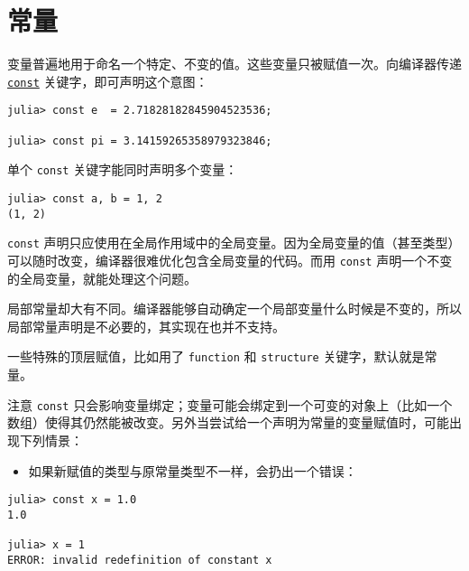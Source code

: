 \hypertarget{5407065244463689569}{}


\section{常量}



变量普遍地用于命名一个特定、不变的值。这些变量只被赋值一次。向编译器传递 \hyperlink{8421885763632484758}{\texttt{const}} 关键字，即可声明这个意图：




\begin{verbatim}
julia> const e  = 2.71828182845904523536;

julia> const pi = 3.14159265358979323846;
\end{verbatim}



单个 \texttt{const} 关键字能同时声明多个变量：




\begin{verbatim}
julia> const a, b = 1, 2
(1, 2)
\end{verbatim}



\texttt{const} 声明只应使用在全局作用域中的全局变量。因为全局变量的值（甚至类型）可以随时改变，编译器很难优化包含全局变量的代码。而用 \texttt{const} 声明一个不变的全局变量，就能处理这个问题。



局部常量却大有不同。编译器能够自动确定一个局部变量什么时候是不变的，所以局部常量声明是不必要的，其实现在也并不支持。



一些特殊的顶层赋值，比如用了 \texttt{function} 和 \texttt{structure} 关键字，默认就是常量。



注意 \texttt{const} 只会影响变量绑定；变量可能会绑定到一个可变的对象上（比如一个数组）使得其仍然能被改变。另外当尝试给一个声明为常量的变量赋值时，可能出现下列情景：



\begin{itemize}
\item 如果新赋值的类型与原常量类型不一样，会扔出一个错误：

\end{itemize}



\begin{verbatim}
julia> const x = 1.0
1.0

julia> x = 1
ERROR: invalid redefinition of constant x
\end{verbatim}



